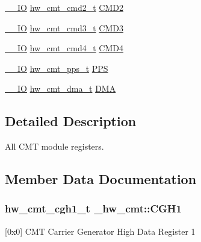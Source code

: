\begin{DoxyCompactItemize}
\item 
\hyperlink{core__sc300_8h_aec43007d9998a0a0e01faede4133d6be}{\+\_\+\+\_\+\+IO} \hyperlink{union__hw__cmt__cmd2}{hw\+\_\+cmt\+\_\+cmd2\+\_\+t} \hyperlink{struct__hw__cmt_a62189149c37f1deebfa7ad2a13a26481}{C\+M\+D2}
\item 
\hyperlink{core__sc300_8h_aec43007d9998a0a0e01faede4133d6be}{\+\_\+\+\_\+\+IO} \hyperlink{union__hw__cmt__cmd3}{hw\+\_\+cmt\+\_\+cmd3\+\_\+t} \hyperlink{struct__hw__cmt_a4324a010f7ffa26fe66ba466ee0d5f37}{C\+M\+D3}
\item 
\hyperlink{core__sc300_8h_aec43007d9998a0a0e01faede4133d6be}{\+\_\+\+\_\+\+IO} \hyperlink{union__hw__cmt__cmd4}{hw\+\_\+cmt\+\_\+cmd4\+\_\+t} \hyperlink{struct__hw__cmt_a6c23c669eb5c92baf42d5563c3c5f5c0}{C\+M\+D4}
\item 
\hyperlink{core__sc300_8h_aec43007d9998a0a0e01faede4133d6be}{\+\_\+\+\_\+\+IO} \hyperlink{union__hw__cmt__pps}{hw\+\_\+cmt\+\_\+pps\+\_\+t} \hyperlink{struct__hw__cmt_ad4236f7458e8f2e5637e3fb35d41fdb5}{P\+PS}
\item 
\hyperlink{core__sc300_8h_aec43007d9998a0a0e01faede4133d6be}{\+\_\+\+\_\+\+IO} \hyperlink{union__hw__cmt__dma}{hw\+\_\+cmt\+\_\+dma\+\_\+t} \hyperlink{struct__hw__cmt_a81329518ec161cac7fa25849729403f5}{D\+MA}
\end{DoxyCompactItemize}


\subsection{Detailed Description}
All C\+MT module registers. 

\subsection{Member Data Documentation}
\subsubsection[{\texorpdfstring{C\+G\+H1}{CGH1}}]{ {\bf hw\+\_\+cmt\+\_\+cgh1\+\_\+t} \+\_\+hw\+\_\+cmt\+::\+C\+G\+H1}\hypertarget{struct__hw__cmt_ac905251f8487858c65f30e24becb98d2}{}\label{struct__hw__cmt_ac905251f8487858c65f30e24becb98d2}
\mbox{[}0x0\mbox{]} C\+MT Carrier Generator High Data Register 1 
